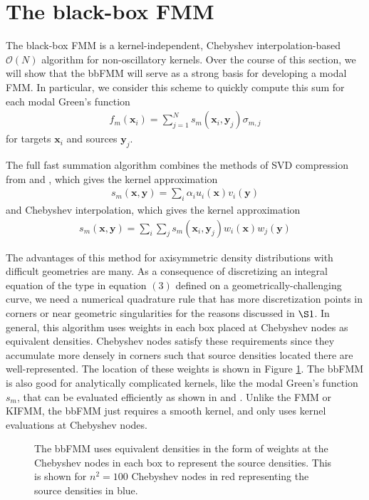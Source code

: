 \documentclass[11pt, oneside]{article}   	%
\begin{document}
\section{The black-box FMM}
The black-box FMM is a kernel-independent, Chebyshev interpolation-based $\mathcal{O}(N)$ algorithm for non-oscillatory kernels. Over the course of this section, we will show that the bbFMM will serve as a strong basis for developing a modal FMM. In particular, we consider this scheme to quickly compute this sum for each modal Green's function
\begin{align}
f_m(\mathbf{x}_i)=\sum_{j=1}^N s_m(\mathbf{x}_i,\mathbf{y}_j)\sigma_{m,j}
\end{align}
for targets $\mathbf{x}_i$ and sources $\mathbf{y}_j$.

The full fast summation algorithm combines the methods of SVD compression from \cite{ZGR} and \cite{MR}, which gives the kernel approximation
\begin{align}
s_m(\mathbf{x},\mathbf{y})=\sum_i \alpha_i u_i(\mathbf{x})v_i(\mathbf{y})
\end{align}
and Chebyshev interpolation, which gives the kernel approximation
\begin{align}
s_m(\mathbf{x},\mathbf{y})=\sum_i\sum_j s_m(\mathbf{x}_i,\mathbf{y}_j)w_i(\mathbf{x})w_j(\mathbf{y})
\end{align}

The advantages of this method for axisymmetric density distributions with difficult geometries are many. As a consequence of discretizing an integral equation of the type in equation $(3)$ defined on a geometrically-challenging curve, we need a numerical quadrature rule that has more discretization points in corners or near geometric singularities for the reasons discussed in $\S1$. In general, this algorithm uses weights in each box placed at Chebyshev nodes as equivalent densities. Chebyshev nodes satisfy these requirements since they accumulate more densely in corners such that source densities located there are well-represented. The location of these weights is shown in Figure \ref{fig:8}. The bbFMM is also good for analytically complicated kernels, like the modal Green's function $s_m$, that can be evaluated efficiently as shown in \cite{HK} and \cite{YYM}. Unlike the FMM or KIFMM, the bbFMM just requires a smooth kernel, and only uses kernel evaluations at Chebyshev nodes.

\begin{figure}[h]
\caption{The bbFMM uses equivalent densities in the form of weights at the Chebyshev nodes in each box to represent the source densities. This is shown for $n^2=100$ Chebyshev nodes in red representing the source densities in blue.}
\label{fig:8}
\centering
\end{figure}
\end{document}
